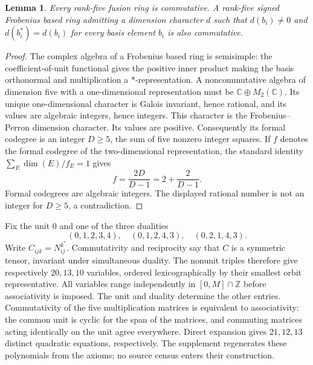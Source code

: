 \documentclass[11pt,a4paper]{article}
\newtheorem{lemma}[theorem]{Lemma}\newtheorem{corollary}[theorem]{Corollary}
\theoremstyle{definition}\newtheorem{definition}[theorem]{Definition}\newtheorem{remark}[theorem]{Remark}
\newcommand{\ZZ}{\mathbb Z}\newcommand{\CC}{\mathbb C}\newcommand{\Q}{\mathbb Q}
\begin{document}
\begin{lemma}\label{lem:commutativity}
Every rank-five fusion ring is commutative. A rank-five signed Frobenius
based ring admitting a dimension character $d$ such that
$d(b_i)\ne0$ and $d(b_i^*)=d(b_i)$ for every basis element $b_i$ is also
commutative.
\end{lemma}
\begin{proof}
The complex algebra of a Frobenius based ring is
semisimple: the coefficient-of-unit functional gives the positive
inner product making the basis orthonormal and multiplication a
$*$-representation. A noncommutative algebra of dimension five with a
one-dimensional representation must be $\CC\oplus M_2(\CC)$.
Its unique one-dimensional character is Galois invariant, hence rational,
and its values are algebraic integers, hence integers.
This character is the Frobenius--Perron dimension character. Its values are positive. Consequently its formal codegree is an
integer $D\geq5$, the sum of five nonzero integer squares.
If $f$ denotes the formal codegree of the two-dimensional representation,
the standard identity $\sum_E\dim(E)/f_E=1$ gives
\[
 f=\frac{2D}{D-1}=2+\frac2{D-1}.
\]
Formal codegrees are algebraic integers. The displayed rational number
is not an integer for $D\geq5$, a contradiction.
\end{proof}

Fix the unit $0$ and one of the three dualities
\[
(0,1,2,3,4),\quad(0,1,2,4,3),\quad(0,2,1,4,3).
\]
Write $C_{ijk}=N_{ij}^{k^*}$. Commutativity and reciprocity say that
$C$ is a symmetric tensor, invariant under simultaneous duality.
The nonunit triples therefore give respectively $20,13,10$ variables,
ordered lexicographically by their smallest orbit representative.
All variables range independently in $[0,M]\cap\ZZ$ before
associativity is imposed. The unit and duality determine the other
entries. Commutativity of the five multiplication matrices is equivalent
to associativity: the common unit is cyclic for the span of the matrices,
and commuting matrices acting identically on the unit agree everywhere.
Direct expansion gives $21,12,13$ distinct quadratic equations,
respectively. The supplement regenerates these polynomials from the
axioms; no source census enters their construction.
\end{document}
